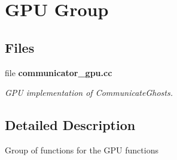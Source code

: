 \section{G\-P\-U Group}
\label{group__gpugroup}
\subsection*{Files}
\begin{DoxyCompactItemize}
\item 
file {\bf communicator\-\_\-gpu.\-cc}
\begin{DoxyCompactList}\small\item\em G\-P\-U implementation of Communicate\-Ghosts. \end{DoxyCompactList}\end{DoxyCompactItemize}


\subsection{Detailed Description}
Group of functions for the G\-P\-U functions 